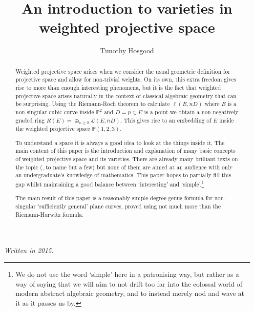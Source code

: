 \documentclass[10pt,notitlepage]{article}
\numberwithin{equation}{subsection}
\newcommand{\pee}{\mathbb{P}}
\begin{document}
    
    \author{Timothy Hosgood}
    \title{An introduction to varieties in weighted projective space}
    \maketitle

    \emph{Written in 2015.}


    \begin{abstract}
        Weighted projective space arises when we consider the usual geometric definition for projective space and allow for non-trivial weights.
        On its own, this extra freedom gives rise to more than enough interesting phenomena, but it is the fact that weighted projective space arises naturally in the context of classical algebraic geometry that can be surprising.
        Using the Riemann-Roch theorem to calculate $\ell(E,nD)$ where $E$ is a non-singular cubic curve inside $\pee^2$ and $D=p\in E$ is a point we obtain a non-negatively graded ring $R(E)=\oplus_{n\geqslant0}\mathcal{L}(E,nD)$.
        This gives rise to an embedding of $E$ inside the weighted projective space $\pee(1,2,3)$.

        To understand a space it is always a good idea to look at the things inside it.
        The main content of this paper is the introduction and explanation of many basic concepts of weighted projective space and its varieties.
        There are already many brilliant texts on the topic (\cite{Reid:2002uy,IanoFletcher:2015wc}, to name but a few) but none of them are aimed at an audience with only an undergraduate's knowledge of mathematics.
        This paper hopes to partially fill this gap whilst maintaining a good balance between `interesting' and `simple'.\footnote{%
            We do not use the word `simple' here in a patronising way, but rather as a way of saying that we will aim to not drift too far into the colossal world of modern abstract algebraic geometry, and to instead merely nod and wave at it as it passes us by.
        }

        The main result of this paper is a reasonably simple degree-genus formula for non-singular `sufficiently general' plane curves, proved using not much more than the Riemann-Hurwitz formula.
    \end{abstract}


    \vspace{-3em}
    \tableofcontents
\end{document}
